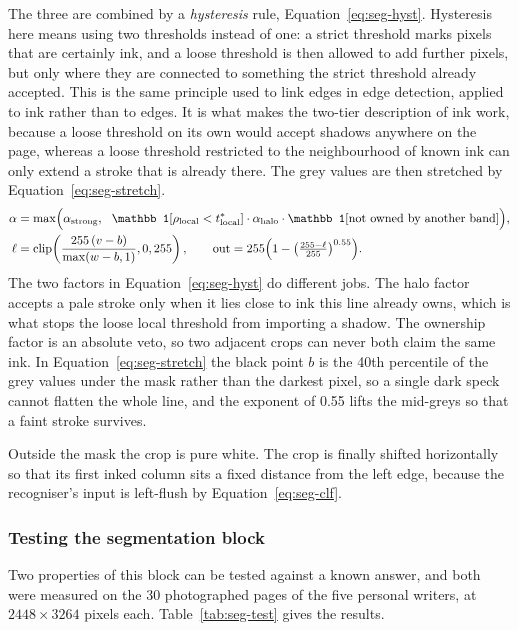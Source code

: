 The three are combined by a \emph{hysteresis} rule, Equation~\ref{eq:seg-hyst}. Hysteresis here means using two thresholds instead of one: a strict threshold marks pixels that are certainly ink, and a loose threshold is then allowed to add further pixels, but only where they are connected to something the strict threshold already accepted. This is the same principle used to link edges in edge detection, applied to ink rather than to edges. It is what makes the two-tier description of ink work, because a loose threshold on its own would accept shadows anywhere on the page, whereas a loose threshold restricted to the neighbourhood of known ink can only extend a stroke that is already there. The grey values are then stretched by Equation~\ref{eq:seg-stretch}.
\begin{align}
\alpha&=\max\Bigl(\alpha_{\mathrm{strong}},\ \ \mathbb 1[\rho_{\mathrm{local}}<t^*_{\mathrm{local}}]\cdot\alpha_{\mathrm{halo}}\cdot\mathbb 1[\text{not owned by another band}]\Bigr),\label{eq:seg-hyst}\\
\ell&=\mathrm{clip}\!\left(\frac{255\,(v-b)}{\max(w-b,1)},0,255\right),\qquad
\mathrm{out}=255\Bigl(1-\bigl(\tfrac{255-\ell}{255}\bigr)^{0.55}\Bigr).\label{eq:seg-stretch}
\end{align}
The two factors in Equation~\ref{eq:seg-hyst} do different jobs. The halo factor accepts a pale stroke only when it lies close to ink this line already owns, which is what stops the loose local threshold from importing a shadow. The ownership factor is an absolute veto, so two adjacent crops can never both claim the same ink. In Equation~\ref{eq:seg-stretch} the black point $b$ is the 40th percentile of the grey values under the mask rather than the darkest pixel, so a single dark speck cannot flatten the whole line, and the exponent of 0.55 lifts the mid-greys so that a faint stroke survives.

Outside the mask the crop is pure white. The crop is finally shifted horizontally so that its first inked column sits a fixed distance from the left edge, because the recogniser's input is left-flush by Equation~\ref{eq:seg-clf}.

\subsubsection{Testing the segmentation block}
\label{sec:seg-test}

Two properties of this block can be tested against a known answer, and both were measured on the 30 photographed pages of the five personal writers, at $2448\times3264$ pixels each. Table~\ref{tab:seg-test} gives the results.

